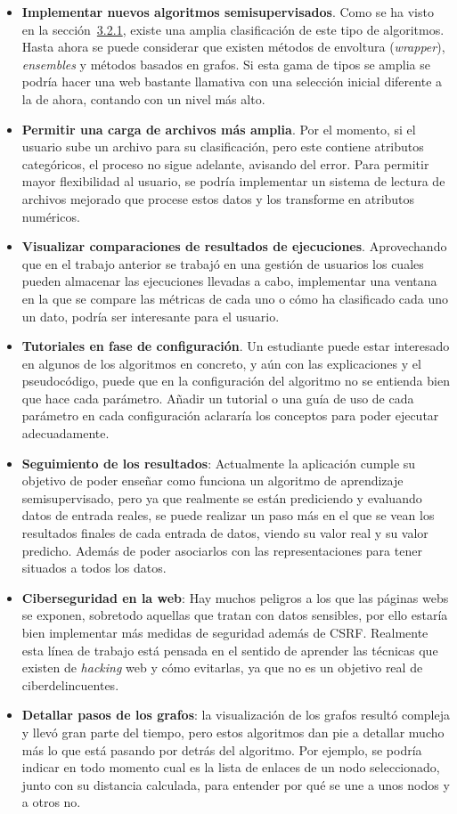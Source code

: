\begin{itemize}
	\item \textbf{Implementar nuevos algoritmos semisupervisados}. Como se ha visto en la sección~\hyperref[sec3:tax]{3.2.1}, existe una amplia clasificación de este tipo de algoritmos. Hasta ahora se puede considerar que existen métodos de envoltura (\textit{wrapper}), \textit{ensembles} y métodos basados en grafos. Si esta gama de tipos se amplia se podría hacer una web bastante llamativa con una selección inicial diferente a la de ahora, contando con un nivel más alto.
	\item \textbf{Permitir una carga de archivos más amplia}. Por el momento, si el usuario sube un archivo para su clasificación, pero este contiene atributos categóricos, el proceso no sigue adelante, avisando del error. Para permitir mayor flexibilidad al usuario, se podría implementar un sistema de lectura de archivos mejorado que procese estos datos y los transforme en atributos numéricos.
	\item \textbf{Visualizar comparaciones de resultados de ejecuciones}. Aprovechando que en el trabajo anterior se trabajó en una gestión de usuarios los cuales pueden almacenar las ejecuciones llevadas a cabo, implementar una ventana en la que se compare las métricas de cada uno o cómo ha clasificado cada uno un dato, podría ser interesante para el usuario.
	\item \textbf{Tutoriales en fase de configuración}. Un estudiante puede estar interesado en algunos de los algoritmos en concreto, y aún con las explicaciones y el pseudocódigo, puede que en la configuración del algoritmo no se entienda bien que hace cada parámetro. Añadir un tutorial o una guía de uso de cada parámetro en cada configuración aclararía los conceptos para poder ejecutar adecuadamente.
	\item \textbf{Seguimiento de los resultados}: Actualmente la aplicación cumple su objetivo de poder enseñar como funciona un algoritmo de aprendizaje semisupervisado, pero ya que realmente se están prediciendo y evaluando datos de entrada reales, se puede realizar un paso más en el que se vean los resultados finales de cada entrada de datos, viendo su valor real y su valor predicho. Además de poder asociarlos con las representaciones para tener situados a todos los datos.
	\item \textbf{Ciberseguridad en la web}: Hay muchos peligros a los que las páginas webs se exponen, sobretodo aquellas que tratan con datos sensibles, por ello estaría bien implementar más medidas de seguridad además de CSRF. Realmente esta línea de trabajo está pensada en el sentido de aprender las técnicas que existen de \textit{hacking} web y cómo evitarlas, ya que no es un objetivo real de ciberdelincuentes.
	\item \textbf{Detallar pasos de los grafos}: la visualización de los grafos resultó compleja y llevó gran parte del tiempo, pero estos algoritmos dan pie a detallar mucho más lo que está pasando por detrás del algoritmo. Por ejemplo, se podría indicar en todo momento cual es la lista de enlaces de un nodo seleccionado, junto con su distancia calculada, para entender por qué se une a unos nodos y a otros no.
\end{itemize}